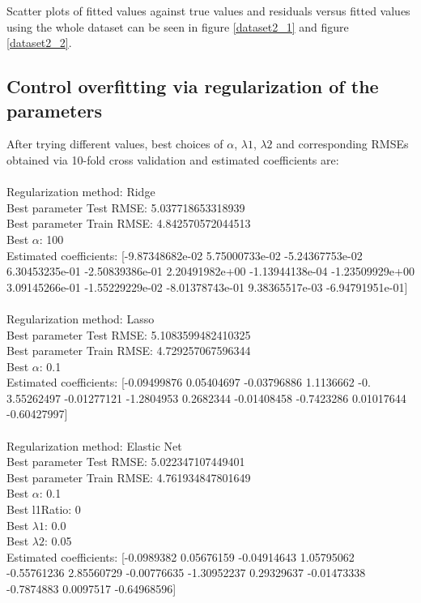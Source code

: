 \documentclass{article}
\begin{document}
Scatter plots of fitted values against true values and residuals versus fitted values using the whole dataset can be seen in figure \ref{dataset2_1} and figure \ref{dataset2_2}.
\newline


\subsection{Control overfitting via regularization of the parameters}
\bigbreak 
After trying different values, best choices of $\alpha$, $\lambda1$, $\lambda2$ and corresponding RMSEs obtained via 10-fold cross validation and estimated coefficients are:\\\\
Regularization method: Ridge\\
Best parameter Test RMSE:  5.037718653318939\\
Best parameter Train RMSE:  4.842570572044513\\
Best $\alpha$:  100\\
Estimated coefficients:  [-9.87348682e-02  5.75000733e-02 -5.24367753e-02  6.30453235e-01 -2.50839386e-01  2.20491982e+00 -1.13944138e-04 -1.23509929e+00 3.09145266e-01 -1.55229229e-02 -8.01378743e-01  9.38365517e-03 -6.94791951e-01]\\\\
Regularization method: Lasso\\
Best parameter Test RMSE:  5.1083599482410325\\
Best parameter Train RMSE:  4.729257067596344\\
Best $\alpha$:  0.1\\
Estimated coefficients:  [-0.09499876  0.05404697 -0.03796886  1.1136662  -0.          3.55262497 -0.01277121 -1.2804953   0.2682344  -0.01408458 -0.7423286   0.01017644 -0.60427997]\\\\
Regularization method: Elastic Net\\
Best parameter Test RMSE:  5.022347107449401\\
Best parameter Train RMSE:  4.761934847801649\\
Best $\alpha$:  0.1\\
Best l1Ratio:  0\\
Best $\lambda1$:  0.0\\
Best $\lambda2$:  0.05\\
Estimated coefficients:  [-0.0989382   0.05676159 -0.04914643  1.05795062 -0.55761236  2.85560729 -0.00776635 -1.30952237  0.29329637 -0.01473338 -0.7874883   0.0097517 -0.64968596]\\
\end{document}
